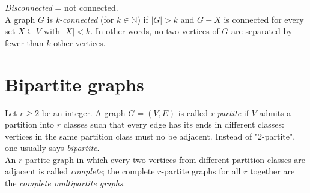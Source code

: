         \textit{Disconnected} = not connected.\\

		A graph $G$ is \textit{k-connected} (for $k \in \mathbb{N}$) if $|G| > k$ and $G - X$ is connected for every set $X \subseteq V$ with $|X| < k$. In other words, no two vertices of $G$ are separated by fewer than $k$ other vertices.
		
	\section{Bipartite graphs}
		Let $r \geq 2$ be an integer. A graph $G = (V, E)$ is called \textit{r-partite} if $V$ admits a partition into $r$ classes such that every edge has its ends in different classes: vertices in the same partition class must no be adjacent. Instead of "2-partite", one usually says \textit{bipartite}.\\
		
		An $r$-partite graph in which every two vertices from different partition classes are adjacent is called \textit{complete}; the complete $r$-partite graphs for all $r$ together are the \textit{complete multipartite graphs}.

